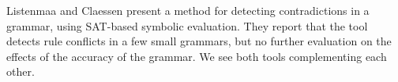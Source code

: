 \documentclass[11pt]{article}
\begin{document}
Listenmaa and Claessen \cite{listenmaa_claessen2016} present a method for detecting contradictions in a grammar, using SAT-based symbolic evaluation. They report that the tool detects rule conflicts in a few small grammars, but no further evaluation on the effects of the accuracy of the grammar.
We see both tools complementing each other.







\end{document}
